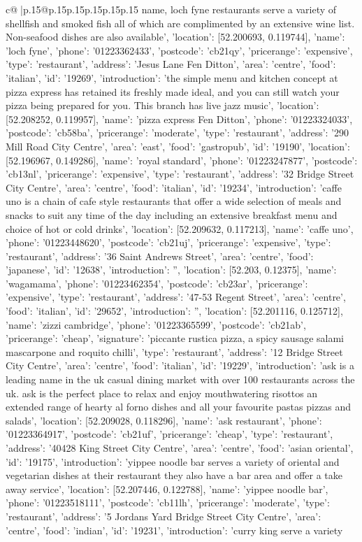 \documentclass{article}
\begin{document}
{\begin{supertabular}{c@{$\;$}|p{.15\linewidth}@{}p{.15\linewidth}p{.15\linewidth}p{.15\linewidth}p{.15\linewidth}p{.15\linewidth}}
{{{name, loch fyne restaurants serve a variety of shellfish and smoked fish all of which are complimented by an extensive wine list. Non-seafood dishes are also available', 'location': [52.200693, 0.119744], 'name': 'loch fyne', 'phone': '01223362433', 'postcode': 'cb21qy', 'pricerange': 'expensive', 'type': 'restaurant'}, {'address': 'Jesus Lane Fen Ditton', 'area': 'centre', 'food': 'italian', 'id': '19269', 'introduction': 'the simple menu and kitchen concept at pizza express has retained its freshly made ideal, and you can still watch your pizza being prepared for you. This branch has live jazz music', 'location': [52.208252, 0.119957], 'name': 'pizza express Fen Ditton', 'phone': '01223324033', 'postcode': 'cb58ba', 'pricerange': 'moderate', 'type': 'restaurant'}, {'address': '290 Mill Road City Centre', 'area': 'east', 'food': 'gastropub', 'id': '19190', 'location': [52.196967, 0.149286], 'name': 'royal standard', 'phone': '01223247877', 'postcode': 'cb13nl', 'pricerange': 'expensive', 'type': 'restaurant'}, {'address': '32 Bridge Street City Centre', 'area': 'centre', 'food': 'italian', 'id': '19234', 'introduction': 'caffe uno is a chain of cafe style restaurants that offer a wide selection of meals and snacks to suit any time of the day including an extensive breakfast menu and choice of hot or cold drinks', 'location': [52.209632, 0.117213], 'name': 'caffe uno', 'phone': '01223448620', 'postcode': 'cb21uj', 'pricerange': 'expensive', 'type': 'restaurant'}, {'address': '36 Saint Andrews Street', 'area': 'centre', 'food': 'japanese', 'id': '12638', 'introduction': '', 'location': [52.203, 0.12375], 'name': 'wagamama', 'phone': '01223462354', 'postcode': 'cb23ar', 'pricerange': 'expensive', 'type': 'restaurant'}, {'address': '47-53 Regent Street', 'area': 'centre', 'food': 'italian', 'id': '29652', 'introduction': '', 'location': [52.201116, 0.125712], 'name': 'zizzi cambridge', 'phone': '01223365599', 'postcode': 'cb21ab', 'pricerange': 'cheap', 'signature': 'piccante rustica pizza, a spicy sausage salami mascarpone and roquito chilli', 'type': 'restaurant'}, {'address': '12 Bridge Street City Centre', 'area': 'centre', 'food': 'italian', 'id': '19229', 'introduction': 'ask is a leading name in the uk casual dining market with over 100 restaurants across the uk. ask is the perfect place to relax and enjoy mouthwatering risottos an extended range of hearty al forno dishes and all your favourite pastas pizzas and salads', 'location': [52.209028, 0.118296], 'name': 'ask restaurant', 'phone': '01223364917', 'postcode': 'cb21uf', 'pricerange': 'cheap', 'type': 'restaurant'}, {'address': '40428 King Street City Centre', 'area': 'centre', 'food': 'asian oriental', 'id': '19175', 'introduction': 'yippee noodle bar serves a variety of oriental and vegetarian dishes at their restaurant they also have a bar area and offer a take away service', 'location': [52.207446, 0.122788], 'name': 'yippee noodle bar', 'phone': '01223518111', 'postcode': 'cb11lh', 'pricerange': 'moderate', 'type': 'restaurant'}, {'address': '5 Jordans Yard Bridge Street City Centre', 'area': 'centre', 'food': 'indian', 'id': '19231', 'introduction': 'curry king serve a variety }}}
\end{supertabular}}
\end{document}
